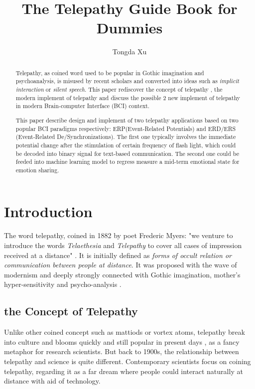 \documentclass[a4paper]{article}
\begin{document}
\title{The Telepathy Guide Book for Dummies}
\author{Tongda Xu}
\maketitle

\begin{abstract}

Telepathy, as coined word used to be popular in Gothic imagination and psychoanalysis, is misused by recent scholars and converted into ideas such as \textit{implicit interaction} or \textit{silent speech}. This paper rediscover the concept of telepathy , the modern implement of telepathy and discuss the possible 2 new implement of telepathy in modern Brain-computer Interface (BCI) context.

This paper describe design and implement of two telepathy applications based on two popular BCI paradigms respectively: ERP(Event-Related Potentials) and ERD/ERS (Event-Related De/Synchronizations). The first one typically involves the immediate potential change after the stimulation of certain frequency of flash light, which could be decoded into binary signal for text-based communication. The second one could be feeded into machine learning model to regress measure a mid-term emotional state for emotion sharing.  
\end{abstract}

\section{Introduction}

The word telepathy, coined in 1882 by poet Frederic Myers: "we venture to introduce the words \textit{Telaethesia} and \textit{Telepathy} to cover all cases of impression received at a distance" \autocite{luckhurst2002invention}. It is initially defined as \textit {forms of occult relation or communication between people at distance}. \autocite{luckhurst2002invention} It was proposed with the wave of modernism and deeply  strongly connected with Gothic imagination, mother's hyper-sensitivity and psycho-analysis \autocite{freud1955dreams}.

\subsection{the Concept of Telepathy}

Unlike other coined concept such as mattiods or vortex atoms, telepathy break into culture and blooms quickly and still popular in present days \autocite{luckhurst2002invention}, as a fancy metaphor for research scientists. But back to 1900s, the relationship between telepathy and science is quite different. Contemporary scientists focus on coining telepathy, regarding it as a far dream where people could interact naturally at distance with aid of technology. 
\end{document}
